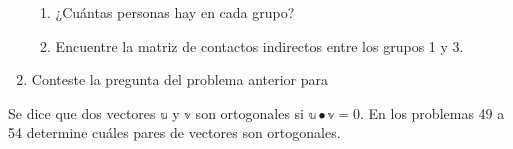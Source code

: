 \begin{enumerate}[start=35]
    \begin{matrizn}
    \end{matrizn}
    \begin{enumerate}
        \item ¿Cuántas personas hay en cada grupo?
        \item Encuentre la matriz de contactos indirectos entre los grupos 1 y 3.
    \end{enumerate}
    \item Conteste la pregunta del problema anterior para
    \begin{matrizn}
    \end{matrizn}
\end{enumerate}
Se dice que dos vectores $\mathbb{u}$ y $\mathbb{v}$ son ortogonales si $\mathbb{u} \bullet \mathbb{v} = 0$. En los problemas 49 a 54 determine cuáles pares de vectores son ortogonales.
